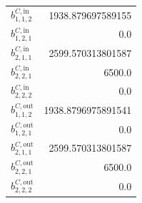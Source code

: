 \documentclass{article}%
\begin{document}
\begin{multicols*}{3}
\begin{supertabular}{lr}
	$b_{1,1,2}^{C,\text{in}}$ & 1938.879697589155 \\%
	$b_{1,2,1}^{C,\text{in}}$ & 0.0 \\%
	$b_{2,1,1}^{C,\text{in}}$ & 2599.570313801587 \\%
	$b_{2,2,1}^{C,\text{in}}$ & 6500.0 \\%
	$b_{2,2,2}^{C,\text{in}}$ & 0.0 \\%
	$b_{1,1,2}^{C,\text{out}}$ & 1938.8796975891541 \\%
	$b_{1,2,1}^{C,\text{out}}$ & 0.0 \\%
	$b_{2,1,1}^{C,\text{out}}$ & 2599.570313801587 \\%
	$b_{2,2,1}^{C,\text{out}}$ & 6500.0 \\%
	$b_{2,2,2}^{C,\text{out}}$ & 0.0 \\%
\end{supertabular}%
\end{multicols*}%
\end{document}
